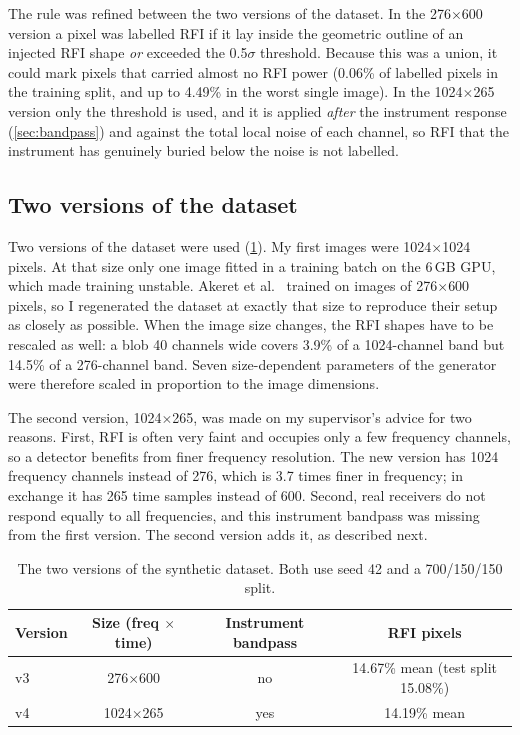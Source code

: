 The rule was refined between the two versions of the dataset. In the
276$\times$600 version a pixel was labelled RFI if it lay inside the geometric
outline of an injected RFI shape \emph{or} exceeded the 0.5$\sigma$ threshold.
Because this was a union, it could mark pixels that carried almost no RFI
power (0.06\% of labelled pixels in the training split, and up to 4.49\% in
the worst single image). In the 1024$\times$265 version only the threshold is
used, and it is applied \emph{after} the instrument response
(\cref{sec:bandpass}) and against the total local noise of each channel, so
RFI that the instrument has genuinely buried below the noise is not
labelled.

\subsection{Two versions of the dataset}
\label{sec:synthetic_versions}
Two versions of the dataset were used (\cref{tab:synth_versions}). My first
images were 1024$\times$1024 pixels. At that size only one image fitted in a
training batch on the 6\,GB GPU, which made training unstable. Akeret et
al.~\cite{akeret2017} trained \tfunet{} on images of 276$\times$600 pixels, so
I regenerated the dataset at exactly that size to reproduce their setup as
closely as possible. When the image size changes, the RFI shapes have to be
rescaled as well: a blob 40 channels wide covers 3.9\% of a 1024-channel band
but 14.5\% of a 276-channel band. Seven size-dependent parameters of the
generator were therefore scaled in proportion to the image dimensions.

The second version, 1024$\times$265, was made on my supervisor's advice for
two reasons. First, RFI is often very faint and occupies only a few frequency
channels, so a detector benefits from finer frequency resolution. The new
version has 1024 frequency channels instead of 276, which is 3.7 times finer
in frequency; in exchange it has 265 time samples instead of 600. Second, real
receivers do not respond equally to all frequencies, and this instrument
bandpass was missing from the first version. The second version adds it, as
described next.

\begin{table}[H]
  \centering
  \caption{The two versions of the synthetic dataset. Both use seed 42 and a
    700/150/150 split.}
  \label{tab:synth_versions}
  \begin{tabular}{lccc}
    \toprule
    Version & Size (freq $\times$ time) & Instrument bandpass & RFI pixels \\
    \midrule
    v3 & 276$\times$600  & no  & 14.67\% mean (test split 15.08\%) \\
    v4 & 1024$\times$265 & yes & 14.19\% mean \\
    \bottomrule
  \end{tabular}
\end{table}

